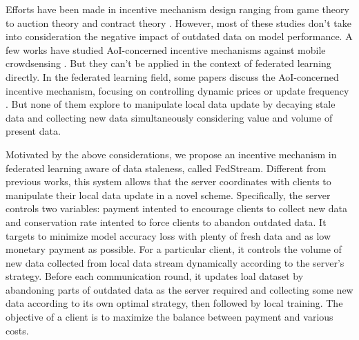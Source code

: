 \documentclass{article}
\theoremstyle{plain}
\theoremstyle{definition}
\theoremstyle{remark}
\begin{document}
Efforts have been made in incentive mechanism design ranging from game theory \cite{lim2020hierarchical} \cite{zhang2022enabling} \cite{huang2024collaboration} to auction theory \cite{jiao2020toward} and contract theory \cite{kang2019incentive} \cite{ding2020optimal}. However, most of these studies don't take into consideration the negative impact of outdated data on model performance.
A few works have studied AoI-concerned incentive mechanisms against mobile crowdsensing \cite{xiao2023aoi} \cite{wang2021taming}. But they can't be applied in the context of federated learning directly.
In the federated learning field, some papers discuss the AoI-concerned incentive mechanism, focusing on controlling dynamic prices or update frequency \cite{wang2019dynamic} \cite{wu2023towards}. But none of them explore to manipulate local data update by decaying stale data and collecting new data simultaneously considering value and volume of present data. 

Motivated by the above considerations, we propose an incentive mechanism in federated learning aware of data staleness, called FedStream.
Different from previous works, this system allows that the server coordinates with clients to manipulate their local data update in a novel scheme.
Specifically, the server controls two variables: payment intented to encourage clients to collect new data and conservation rate intented to force clients to abandon outdated data. It targets to minimize model accuracy loss with plenty of fresh data and as low monetary payment as possible.
For a particular client, it controls the volume of new data collected from local data stream dynamically according to the server's strategy. Before each communication round, it updates loal dataset by abandoning parts of outdated data as the server required and collecting some new data according to its own optimal strategy, then followed by local training. The objective of a client is to maximize the balance between payment and various costs.
\end{document}
